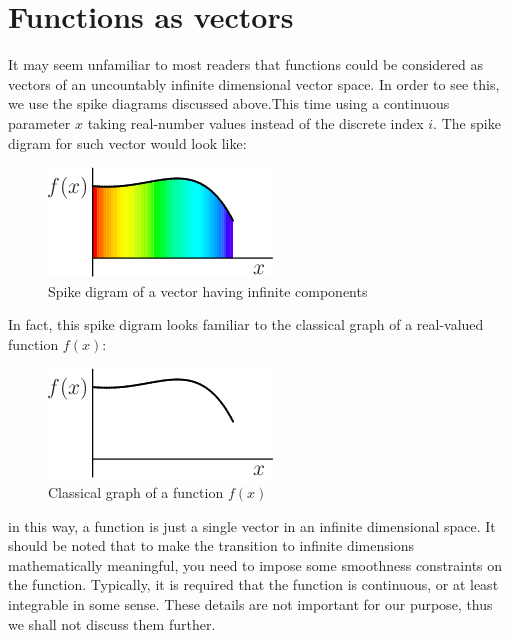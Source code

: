    	\section{Functions as vectors}
   	It may seem unfamiliar to most readers that functions could be considered as vectors of an uncountably infinite dimensional vector space. In order to see this, we use the spike diagrams discussed above.This time using a continuous parameter $x$  taking real-number values instead of the discrete index $i$. The spike digram for such vector would look like:
   	   \begin{figure}[h!]
   	   	\centering
   	   	\includegraphics[width=0.5 \textwidth]{./figures/inf}
   	   	\caption{ Spike digram of a vector having infinite components}
   	   \end{figure}
 In fact, this spike digram looks familiar to the classical graph of a real-valued function $ f(x)$:
 \begin{figure}[h!]
 	\centering
 	\includegraphics[width=0.5 \textwidth]{./figures/func}
 	\caption{ Classical graph of a function $ f(x)$}
 \end{figure}
 in this way, a function is just a single vector in an infinite dimensional space. It should be noted that to make the transition to infinite dimensions mathematically meaningful, you need to impose some smoothness constraints on the function. Typically, it is required that the function is continuous, or at least integrable in some sense. These details are not important for our purpose, thus we shall not discuss them further.
